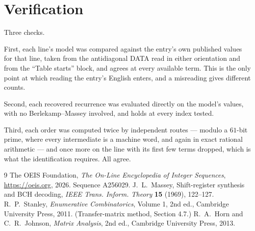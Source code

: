 \documentclass[11pt,a4paper]{article}
\theoremstyle{plain}
\theoremstyle{definition}
\begin{document}
\section{Verification}

Three checks.

First, each line's model was compared against the entry's own published values for that line,
taken from the antidiagonal DATA read in either orientation and from the ``Table starts''
block, and agrees at every available term. This is the only point at which reading the entry's
English enters, and a misreading gives different counts.

Second, each recovered recurrence was evaluated directly on the model's values, with no
Berlekamp--Massey involved, and holds at every index tested.

Third, each order was computed twice by independent routes --- modulo a $61$-bit prime, where
every intermediate is a machine word, and again in exact rational arithmetic --- and once more
on the line with its first few terms dropped, which is what the identification requires. All
agree.

\begin{thebibliography}{9}
 The OEIS Foundation, \emph{The On-Line Encyclopedia of Integer
Sequences}, \url{https://oeis.org}, 2026. Sequence A256029.
 J.~L.~Massey, Shift-register synthesis and BCH decoding, \emph{IEEE
Trans. Inform. Theory} \textbf{15} (1969), 122--127.
 R.~P.~Stanley, \emph{Enumerative Combinatorics}, Volume 1, 2nd ed.,
Cambridge University Press, 2011. (Transfer-matrix method, Section 4.7.)
 R.~A.~Horn and C.~R.~Johnson, \emph{Matrix Analysis}, 2nd ed., Cambridge
University Press, 2013.
\end{thebibliography}
\end{document}
